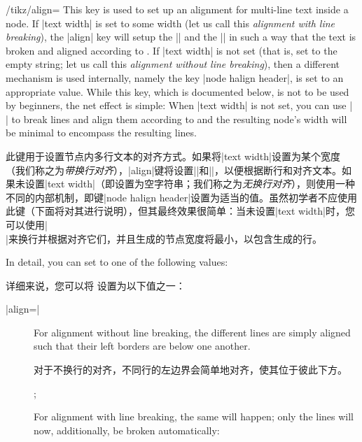 \begin{key}{/tikz/align=}
    This key is used to set up an alignment for multi-line text inside a node.
    If |text width| is set to some width (let us call this \emph{alignment with
    line breaking}), the |align| key will setup the |\leftskip| and the
    |\rightskip| in such a way that the text is broken and aligned according to
    . If |text width| is not set (that is, set to the
    empty string; let us call this \emph{alignment without line breaking}),
    then a different mechanism is used internally, namely the key
    |node halign header|, is set to an appropriate value. While this key, which
    is documented below, is not to be used by beginners, the net effect is
    simple: When |text width| is not set, you can use |\\| to break lines and
    align them according to  and the resulting node's
    width will be minimal to encompass the resulting lines.

    此键用于设置节点内多行文本的对齐方式。如果将|text width|设置为某个宽度（我们称之为\emph{带换行对齐}），|align|键将设置|\leftskip|和|\rightskip|，以便根据断行和对齐文本。如果未设置|text width|（即设置为空字符串；我们称之为\emph{无换行对齐}），则使用一种不同的内部机制，即键|node halign header|设置为适当的值。虽然初学者不应使用此键（下面将对其进行说明），但其最终效果很简单：当未设置|text width|时，您可以使用|\\|来换行并根据对齐它们，并且生成的节点宽度将最小，以包含生成的行。



    In detail, you can set  to one of the following values:
    
    详细来说，您可以将  设置为以下值之一：


    \begin{description}
        \item[|align=|] For alignment without line breaking,
            the different lines are simply aligned such that their left borders
            are below one another.

            对于不换行的对齐，不同行的左边界会简单地对齐，使其位于彼此下方。
\begin{codeexample}[]
\tikz {};
\end{codeexample}
            For alignment with line breaking, the same will happen; only the
            lines will now, additionally, be broken automatically:


\end{description}
\end{key}
